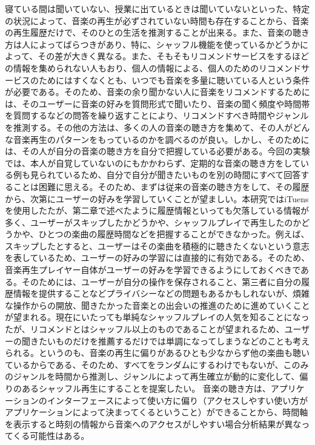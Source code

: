 \documentclass[11pt, twocolumn]{jsarticle}
\begin{document}
寝ている間は聞いていない、授業に出ているときは聞いていないといった、特定の状況によって、音楽の再生が必ずされていない時間も存在することから、音楽の再生履歴だけで、そのひとの生活を推測することが出来る。また、音楽の聴き方は人によってばらつきがあり、特に、シャッフル機能を使っているかどうかによって、その差が大きく異なる。また、そもそもリコメンドサービスをするほどの情報を集められない人もおり、個人の情報による、個人のためのリコメンドサービスのためにはすくなくとも、いつでも音楽を多量に聴いている人という条件が必要である。そのため、音楽の余り聞かない人に音楽をリコメンドするためには、そのユーザーに音楽の好みを質問形式で聞いたり、音楽の聞く頻度や時間帯を質問するなどの問答を繰り返すことにより、リコメンドすべき時間やジャンルを推測する。その他の方法は、多くの人の音楽の聴き方を集めて、その人がどんな音楽再生のパターンをもっているのかを調べるのが良い。しかし、そのためには、その人が自分の音楽の聴き方を自分で把握している必要がある。今回の実験では、本人が自覚していないのにもかかわらず、定期的な音楽の聴き方をしている例も見られているため、自分で自分が聞きたいものを別の時間にすべて回答することは困難に思える。そのため、まずは従来の音楽の聴き方をして、その履歴から、次第にユーザーの好みを学習していくことが望ましい。本研究ではiTuensを使用したたが、第二章で述べたように履歴情報といっても欠落している情報が多く、ユーザーがスキップしたかどうかや、シャッフルプレイで再生したのかどうかや、ひとつの楽曲の履歴時間などを把握することができなかった。例えば、スキップしたとすると、ユーザーはその楽曲を積極的に聴きたくないという意志を表しているため、ユーザーの好みの学習には直接的に有効である。そのため、音楽再生プレイヤー自体がユーザーの好みを学習できるようにしておくべきである。そのためには、ユーザーが自分の操作を保存されること、第三者に自分の履歴情報を提供することなどプライバシーなどの問題もあるかもしれないが、煩雑な操作からの開放、聞きたかった音楽との出会いの推進のために進めていくことが望まれる。現在にいたっても単純なシャッフルプレイの人気を知ることになったが、リコメンドとはシャッフル以上のものであることが望まれるため、ユーザーの聞きたいものだけを推薦するだけでは単調になってしまうなどのことも考えられる。というのも、音楽の再生に偏りがあるひとも少なからず他の楽曲も聴いているからである、そのため、すべてをランダムにするわけでもないが、このみのジャンルを時間から推測し、ジャンルによって再生確立が動的に変化して、偏りのあるシャッフル再生にすることを提案したい。
音楽の聴き方は、アプリケーションのインターフェースによって使い方に偏り（アクセスしやすい使い方がアプリケーションによって決まってくるということ）ができることから、時間軸を表示すると時刻の情報から音楽へのアクセスがしやすい場合分析結果が異なってくる可能性はある。
\end{document}
